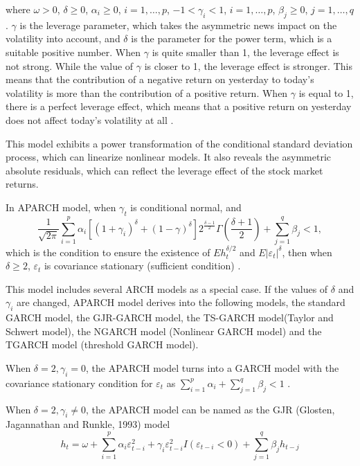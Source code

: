 where $\omega>0$, $\delta\geq0$, $\alpha_{i}\geq0$, $i=1, \ldots, p$, $-1<\gamma_{i}<1$, $i=1, \ldots, p$, $\beta_{j}\geq0$, $j=1, \ldots, q$. $\gamma$ is the leverage parameter, which takes the asymmetric news impact on the volatility into account,  and $\delta$ is the parameter for the power term, which is a suitable positive number. When $\gamma$ is quite smaller than 1, the leverage effect is not strong. While the value of $\gamma$  is closer to 1, the leverage effect is stronger. This means that the contribution of a negative return on yesterday to today's volatility is more than the contribution of a positive return. When $\gamma$ is equal to 1, there is a perfect leverage effect, which means that a positive return on yesterday does not affect today's volatility at all \citep{FengYuanhua;Sun2013}.

This model exhibits a power transformation of the conditional standard deviation process, which can linearize nonlinear models. It also reveals the asymmetric absolute residuals, which can reflect the leverage effect of the stock market returns.


In APARCH model, when $\gamma_{t}$ is conditional normal, and \[\frac{1}{\sqrt{2\pi}}\sum_{i=1}^{p}\alpha_{i} [\left(1 + \gamma_{i} \right)^\delta + (1-\gamma)^{\delta}]2^{\frac{\delta-1}{2}}\Gamma (\frac{\delta+1}{2}) + \sum_{j=1}^{q}\beta_{j}<1,\]
which is the condition to ensure the existence of $Eh_{t}^{\delta/2}$ and $E|\varepsilon_{t}|^{\delta}$, then when $\delta\geq2$, $\varepsilon_t$   is covariance stationary (sufficient condition) \citep{Ding1993}.


This model includes several ARCH models as a special case. If the values of $\delta$ and $\gamma_{i}$ are changed, APARCH model derives into the following models, the standard GARCH model, the GJR-GARCH model, the TS-GARCH model(Taylor and Schwert model), the NGARCH model (Nonlinear GARCH model) and the TGARCH model (threshold GARCH model).

When $\delta=2,\gamma_{i}=0$, the APARCH model turns into a GARCH model with the covariance stationary condition for  $\varepsilon_{t}$ as $\sum_{i=1}^{p}\alpha_{i} + \sum_{j=1}^{q}\beta_{j}<1$ \citep{Bollerslev1986}.

When $\delta = 2, \gamma_{i}\neq 0$, the APARCH model can be named as the GJR (Glosten, Jagannathan and Runkle, 1993) model 
\[h_{t}=\omega + \sum_{i=1}^{p}\alpha_{i}\varepsilon_{t-i}^{2}+\gamma_{i}\varepsilon_{t-i}^{2}I(\varepsilon_{t-i}<0)+\sum_{j=1}^{q}\beta
_{j}h_{t-j}\]

